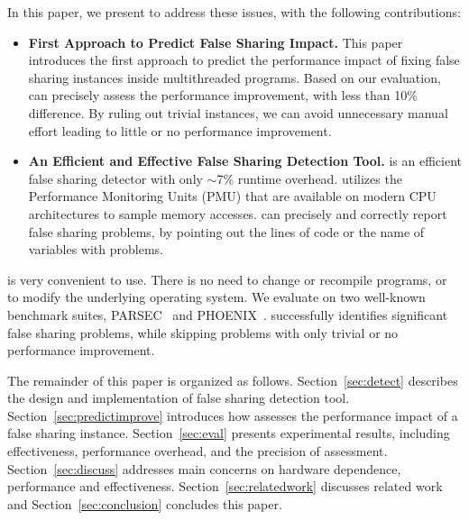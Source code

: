 In this paper, we present \cheetah{} to address these issues, with the following contributions:
\begin{itemize} 

\item {\bf First Approach to Predict False Sharing Impact.} This paper introduces the first approach to predict the performance impact of fixing false sharing instances inside multithreaded programs. Based on our evaluation, \cheetah{} can precisely assess the performance improvement, with less than 10\% difference. By ruling out trivial instances, we can avoid unnecessary manual effort leading to little or no performance improvement. 

\item {\bf An Efficient and Effective False Sharing Detection Tool.} \cheetah{} is an efficient false sharing detector with only $\sim$7\% runtime overhead. \Cheetah{} utilizes the Performance Monitoring Units (PMU) that are available on modern CPU architectures to sample memory accesses. \cheetah{} can precisely and correctly report false sharing problems, by pointing out the lines of code or the name of variables with problems. 
\end{itemize}

\cheetah{} is very convenient to use. There is no need to change or recompile programs, or to modify the underlying operating system. We evaluate \cheetah{} on two well-known benchmark suites, PARSEC~\cite{phoenix-hpca} and PHOENIX~\cite{parsec}. \cheetah{} successfully identifies significant false sharing problems, while skipping problems with only trivial or no performance improvement.
%

The remainder of this paper is organized as follows. 
Section~\ref{sec:detect} describes the design and implementation of false sharing detection tool. Section~\ref{sec:predictimprove} introduces how \cheetah{} assesses the performance impact of a false sharing instance. Section~\ref{sec:eval} presents experimental results, including effectiveness, performance overhead, and the precision of assessment. Section~\ref{sec:discuss} addresses main concerns on hardware dependence, performance and effectiveness. Section~\ref{sec:relatedwork} discusses related work and Section~\ref{sec:conclusion} concludes this paper. 



